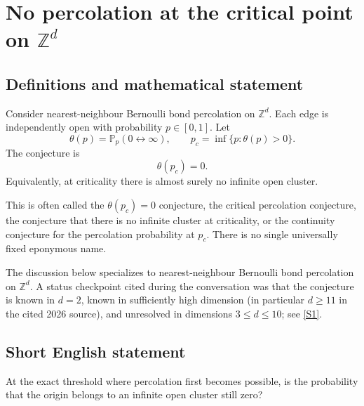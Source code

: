 \documentclass[11pt]{article}
\begin{document}
\section*{\texorpdfstring{No percolation at the critical point on $\mathbb{Z}^d$}{No percolation at the critical point on \$\textbackslash{}mathbb\{Z\}\textasciicircum{}d\$}}\label{critical-percolation}\label{10100001}

\subsection{Definitions and mathematical statement}
Consider nearest-neighbour Bernoulli bond percolation on \(\mathbb Z^d\). Each edge is independently open with probability \(p\in[0,1]\). Let
\[
\theta(p)=\mathbb P_p(0\leftrightarrow\infty),
\qquad
p_c=\inf\{p:\theta(p)>0\}.
\]
The conjecture is
\[
\boxed{\theta(p_c)=0.}
\]
Equivalently, at criticality there is almost surely no infinite open cluster.

This is often called the \(\theta(p_c)=0\) conjecture, the critical percolation conjecture, the conjecture that there is no infinite cluster at criticality, or the continuity conjecture for the percolation probability at \(p_c\). There is no single universally fixed eponymous name.

The discussion below specializes to nearest-neighbour Bernoulli bond percolation on \(\mathbb Z^d\). A status checkpoint cited during the conversation was that the conjecture is known in \(d=2\), known in sufficiently high dimension (in particular \(d\ge 11\) in the cited 2026 source), and unresolved in dimensions \(3\le d\le10\); see \href{https://arxiv.org/html/2608.23661v1}{[S1]}.

\subsection{Short English statement}
At the exact threshold where percolation first becomes possible, is the probability that the origin belongs to an infinite open cluster still zero?
\end{document}
